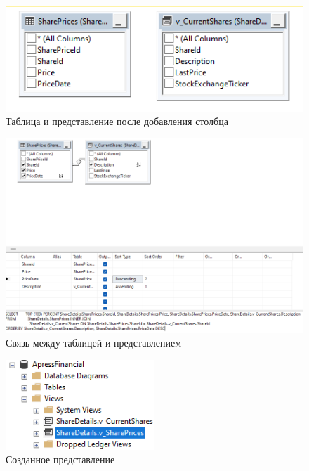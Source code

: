\documentclass[a4paper, 14pt]{extarticle}
\begin{document}
\begin{figure}[H]
  \centering
  \includegraphics[width=\textwidth]{images/task-2/6.png}
  \caption{Таблица и представление после добавления столбца}
  \label{fig:task-2-6}
\end{figure}

\begin{figure}[H]
  \centering
  \includegraphics[width=\textwidth]{images/task-2/7.png}
  \caption{Связь между таблицей и представлением}
  \label{fig:task-2-7}
\end{figure}

\begin{figure}[H]
  \centering
  \includegraphics[width=0.5\textwidth]{images/task-2/8.png}
  \caption{Созданное представление}
  \label{fig:task-2-8}
\end{figure}
\end{document}
